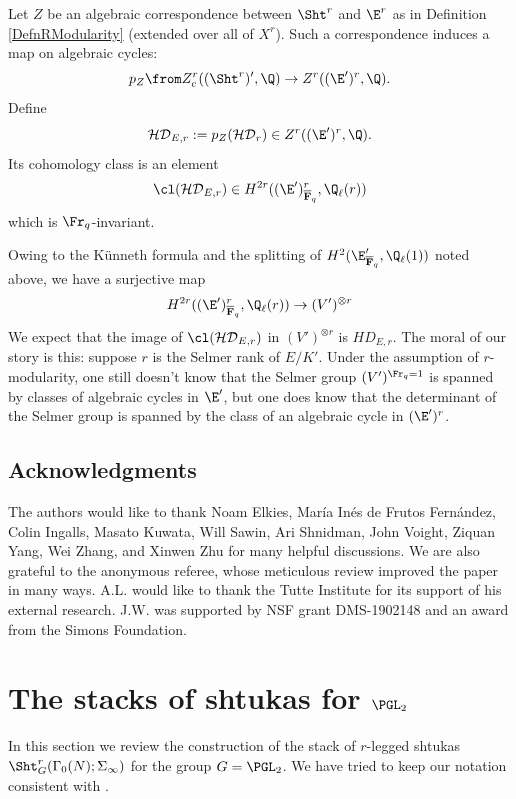 \documentclass{article}
\def\F{\mathbf{F}}
\begin{document}
Let $Z$ be an algebraic correspondence between $\Sht^r$ and $\E^r$ as in Definition \ref{DefnRModularity} (extended over all of $X^r$).   Such a correspondence induces a map on algebraic cycles:
\[ p_Z\from Z^r_c((\Sht^r)',\Q)\to Z^r((\E')^r,\Q). \]
Define
\[ \mathcal{HD}_{E,r}: = p_Z(\mathcal{HD}_r) \in Z^r((\E')^r,\Q).\]
Its cohomology class is an element
\[ \cl(\mathcal{HD}_{E,r})\in H^{2r}((\E')^r_{\overline{\F}_q},\Q_\ell(r)) \]
which is $\Fr_q$-invariant.  

Owing to the K\"unneth formula and the splitting of $H^2(\E'_{\overline{\F}_q},\Q_\ell(1))$ noted above, we have a surjective map
\begin{equation}
\label{EqMapFromHrToVr}
H^{2r}((\E')^r_{\overline{\F}_q},\Q_\ell(r)) \to (V')^{\otimes r}
\end{equation}
We expect that the image of $\cl(\mathcal{HD}_{E,r})$ in $(V')^{\otimes r}$ is $HD_{E,r}$.    The moral of our story is this:  suppose $r$ is the Selmer rank of $E/K'$.  Under the assumption of $r$-modularity, one still doesn't know that the Selmer group $(V')^{\Fr_q=1}$ is spanned by classes of algebraic cycles in $\E'$, but one does know that the determinant of the Selmer group is spanned by the class of an algebraic cycle in $(\E')^r$.  



\subsection{Acknowledgments}

The authors would like to thank Noam Elkies, Mar\'ia In\'es de Frutos Fern\'andez, Colin Ingalls, Masato Kuwata, Will Sawin,  Ari Shnidman, John Voight, Ziquan Yang, Wei Zhang, and Xinwen Zhu for many helpful discussions.  We are also grateful to the anonymous referee,
whose meticulous review improved the paper in many ways.  A.L. would like to thank the Tutte Institute for its support of his external research.   J.W. was supported by NSF grant DMS-1902148 and an award from the Simons Foundation.   

\section{The stacks of shtukas for $\PGL_2$}
\label{sec:shtukareview}

In this section we review the construction of the stack of $r$-legged shtukas $\Sht^r_G(\Gamma_0(N);\Sigma_\infty)$ for the group $G=\PGL_2$.  We have tried to keep our notation consistent with \cite{YunZhangShtukasII}.   
\end{document}
